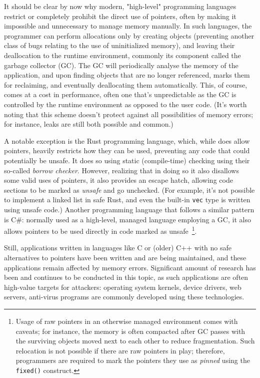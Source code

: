 It should be clear by now why modern, "high-level" programming languages restrict or completely prohibit the direct use of pointers, often by making it impossible and unnecessary to manage memory manually. In such languages, the programmer can perform allocations only by creating objects (preventing another class of bugs relating to the use of uninitialized memory), and leaving their deallocation to the runtime environment, commonly its component called the garbage collector (GC). The GC will periodically analyse the memory of the application, and upon finding objects that are no longer referenced, marks them for reclaiming, and eventually deallocating them automatically. This, of course, comes at a cost in performance, often one that's unpredictable as the GC is controlled by the runtime environment as opposed to the user code. (It's worth  noting that this scheme doesn't protect against all possibilities of memory errors; for instance, leaks are still both possible and common.)

A notable exception is the Rust programming language, which, while does allow pointers, heavily restricts how they can be used, preventing any code that could potentially be unsafe. It does so using static (compile-time) checking using their so-called \emph{borrow checker}. However, realizing that in doing so it also disallows some valid uses of pointers, it also provides an escape hatch, allowing code sections to be marked as \emph{unsafe} and go unchecked. (For example, it's not possible to implement a linked list in safe Rust, and even the built-in \lstinline!vec! type is written using unsafe code.) Another programming language that follows a similar pattern is C\#: normally used as a high-level, managed language employing a GC, it also allows pointers to be used directly in code marked as unsafe~\footnote{Usage of raw pointers in an otherwise managed environment comes with caveats; for instance, the memory is often compacted after GC passes with the surviving objects moved next to each other to reduce fragmentation. Such relocation is not possible if there are raw pointers in play; therefore, programmers are required to mark the pointers they use as \emph{pinned} using the \lstinline!fixed()! construct.}.

Still, applications written in languages like C or (older) C++ with no safe alternatives to pointers have been written and are being maintained, and these applications remain affected by memory errors. Significant amount of research has been and continues to be conducted in this topic, as such applications are often high-value targets for attackers: operating system kernels, device drivers, web servers, anti-virus programs are commonly developed using these technologies.

